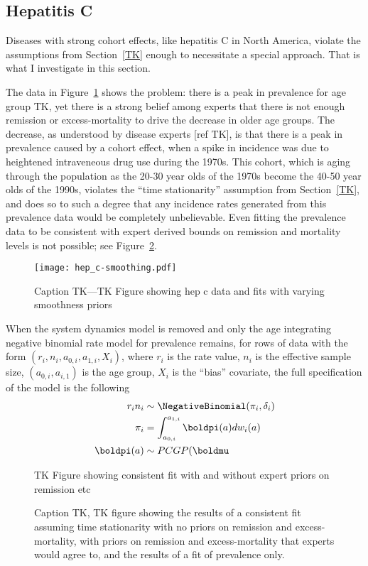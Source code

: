 \subsection{Hepatitis C}
Diseases with strong cohort effects, like hepatitis C in North America,
violate the assumptions from Section~\ref{TK} enough to
necessitate a special approach.  That is what I investigate in this
section.

The data in Figure~\ref{hep_c-data} shows the problem: there is a peak
in prevalence for age group TK, yet there is a strong belief among
experts that there is not enough remission or excess-mortality to
drive the decrease in older age groups.  The decrease, as understood
by disease experts [ref TK], is that there is a peak in prevalence
caused by a cohort effect, when a spike in incidence was due to
heightened intraveneous drug use during the 1970s.  This cohort, which
is aging through the population as the 20-30 year olds of the 1970s
become the 40-50 year olds of the 1990s, violates the ``time
stationarity'' assumption from Section~\ref{TK}, and does so to such a
degree that any incidence rates generated from this prevalence data
would be completely unbelievable.  Even fitting the prevalence data to
be consistent with expert derived bounds on remission and mortality
levels is not possible; see Figure~\ref{hep_c-consistent}.
\begin{figure}
\begin{center}
\texttt{[image: hep\_c-smoothing.pdf]}
\end{center}
\caption{Caption TK---TK Figure showing hep c data and fits with varying smoothness priors}
\label{hep_c-data}
\end{figure}

When the system dynamics model is removed and only the age integrating
negative binomial rate model for prevalence remains, for rows of data with the form $(r_i, n_i, a_{0,i}, a_{1,i},
X_i)$, where $r_i$ is the rate value, $n_i$ is the effective sample
size, $(a_{0,i}, a_{i,1})$ is the age group, $X_i$ is the ``bias''
covariate,  the full specification of the
model is the following
\begin{align*}
r_i n_i &\sim \NegativeBinomial(\pi_i, \delta_i)\\
\pi_i &= \int_{a_{0,i}}^{a_{1,i}} \boldpi(a)dw_i(a)\\
\boldpi(a) &\sim PCGP(\boldmu
\end{align*}

\begin{figure}
\begin{center}
TK Figure showing consistent fit with and without expert priors on remission etc
\end{center}
\caption{Caption TK, TK figure showing the results of a consistent fit
  assuming time stationarity with no priors on remission and
  excess-mortality, with priors on remission and excess-mortality that
  experts would agree to, and the results of a fit of prevalence only.
}
\label{hep_c-consistent}
\end{figure}

